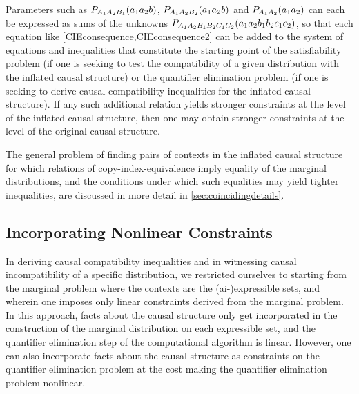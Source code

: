 \documentclass[aps,english,10pt,superscriptaddress,onecolumn,twoside,longbibliography,pra,floatfix,fleqn,nofootinbib]{revtex4-1}
\theoremstyle{definition}
\newcommand{\p}[2][]{{P_{#1}}\parenths{#2}}
\DeclarePairedDelimiter{\parenths}{\lparen}{\rparen}
\begin{document}
Parameters such as $\p[A_1 A_2 B_1]{a_1 a_2 b}$, $\p[A_1 A_2 B_2]{a_1 a_2 b}$ and $\p[A_1 A_2]{a_1 a_2}$ can each be expressed as sums of the unknowns $\p[A_1 A_2 B_1 B_2 C_1 C_2]{a_1 a_2 b_1 b_2 c_1 c_2}$, so that each equation like \cref{CIEconsequence,CIEconsequence2} can be added to the system of equations and inequalities that constitute the starting point of the satisfiability problem (if one is seeking to test the compatibility of a given distribution with the inflated causal structure) or the quantifier elimination problem (if one is seeking to derive causal compatibility inequalities for the inflated causal structure).  If any such additional relation yields stronger constraints at the level of the inflated causal structure, then one may obtain stronger constraints at the level of the original causal structure.

The general problem of finding pairs of contexts in the inflated causal structure for which relations of copy-index-equivalence imply equality of the marginal distributions, and the conditions under which such equalities may yield tighter inequalities, are discussed in more detail in \cref{sec:coincidingdetails}.

\subsection{Incorporating Nonlinear Constraints} \label{sec:nonlinearsatproblem}

In deriving causal compatibility inequalities and in witnessing causal incompatibility of a specific distribution, we restricted ourselves to starting from the marginal problem where the contexts are the (ai-)expressible sets, and wherein one imposes only linear constraints derived from the marginal problem.  In this approach, facts about the causal structure only get incorporated in the construction of the marginal distribution on each expressible set, and the quantifier elimination step of the computational algorithm is linear.  However, one can also incorporate facts about the causal structure as constraints on the quantifier elimination problem at the cost making the quantifier elimination problem nonlinear. 
\end{document}
